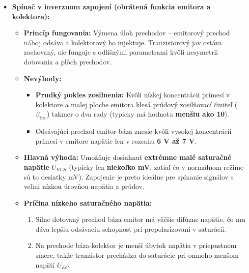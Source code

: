 \begin{itemize}
\begin{itemize}
		\item \textbf{Postupy na zrýchlenie spínania (skrátenie $t_s$):}
		\begin{enumerate}
			\item \textbf{Rekombinačné centrá:} Technologické zavedenie prímesí do bázy urýchľuje zánik náboja, nevýhodou je ale trvalé zníženie zosilňovacieho činiteľa $\beta$ (v aktivnom režime max. 50).
			\item \textbf{Urýchľovací kapacitor:} Zapojenie kondenzátora $C_B$ paralelne k bázovému odporu $R_B$. Pri zostupnej hrane pomáha rýchlo odsať náboj z bázy.
			\item \textbf{Nenasýtený režim:} Obvodové zaistenie, aby tranzistor nikdy neprešiel do hlbokej saturácie a zostal v aktívnom režime (napr. ECL logika).
			\item \textbf{Schottkyho desaturačná dióda:} Zapája sa medzi bázu a kolektor. Odoberá prebytočný bázový prúd a zabraňuje hlbokej saturácii. \textbf{Nevýhoda:} Zvyšuje napätie $U_{CE}$ v zopnutom stave, čo výrazne zvyšuje trvalé vodivostné straty $P_Z$.
		\end{enumerate}
	\end{itemize}
	\item \textbf{Spínač v inverznom zapojení (obrátená funkcia emitora a kolektora):}
	\begin{itemize}
		\item \textbf{Princíp fungovania:} Výmena úloh prechodov – emitorový prechod náboj odsáva a kolektorový ho injektuje. Tranzistorový jav ostáva zachovaný, ale funguje s odlišnými parametrami kvôli nesymetrii dotovania a plôch prechodov.
		\item \textbf{Nevýhody:}
		\begin{itemize}
			\item \textbf{Prudký pokles zosilnenia:} Kvôli nízkej koncentrácii prímesí v kolektore a malej ploche emitora klesá prúdový zosilňovací činiteľ ($\beta_{inv}$) takmer o dva rady (typicky má hodnotu \textbf{menšiu ako 10}).
			\item {} Odsávajúci prechod emitor-báza znesie kvôli vysokej koncentrácii prímesí v emitore napätie len v rozsahu \textbf{6 V až 7 V}.
		\end{itemize}
		\item \textbf{Hlavná výhoda:} Umožňuje dosiahnuť \textbf{extrémne malé saturačné napätie} $U_{ECS}$ (typicky len \textbf{niekoľko mV}, zatiaľ čo v normálnom režime sú to desiatky mV). Zapojenie je preto ideálne pre spínanie signálov s veľmi nízkou úrovňou napätia a prúdov.
		\item \textbf{Príčina nízkeho saturačného napätia:} 
		\begin{enumerate}
			\item Silne dotovaný prechod báza-emitor má väčšie difúzne napätie, čo mu dáva lepšiu odsávaciu schopnosť pri prepolarizovaní v saturácii.
			\item Na prechode báza-kolektor je menší úbytok napätia v priepustnom smere, takže tranzistor prechádza do saturácie pri omnoho menšom napätí $U_{EC}$.
		\end{enumerate}
	\end{itemize}
\end{itemize}
